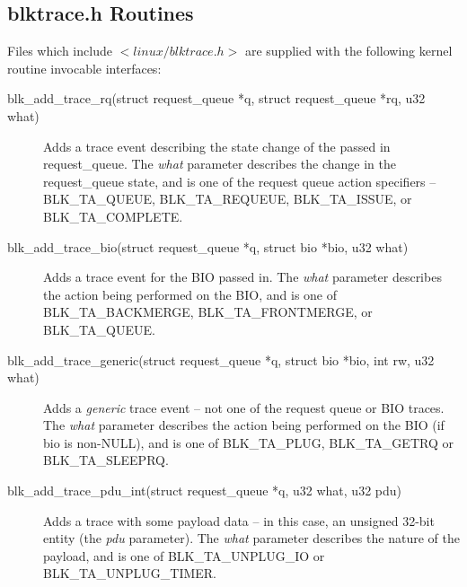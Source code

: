 \documentclass{article}
\begin{document}
\subsection{blktrace.h Routines}
Files which include $<linux/blktrace.h>$ are supplied with the following
kernel routine invocable interfaces:

\begin{description}
  \item[blk\_add\_trace\_rq(struct request\_queue *q, struct request\_queue 
  								*rq, u32 what)]
	Adds a trace event describing the state change of the passed in
	request\_queue. The \emph{what} parameter describes the change in
	the request\_queue state, and is one of the request queue action 
	specifiers -- BLK\_TA\_QUEUE, BLK\_TA\_REQUEUE, BLK\_TA\_ISSUE,
	or BLK\_TA\_COMPLETE.

  \item[blk\_add\_trace\_bio(struct request\_queue *q, struct bio *bio, 
  								u32 what)]
	Adds a trace event for the BIO passed in. The \emph{what} parameter
	describes the action being performed on the BIO, and is one of
	BLK\_TA\_BACKMERGE, BLK\_TA\_FRONTMERGE, or BLK\_TA\_QUEUE.

  \item[blk\_add\_trace\_generic(struct request\_queue *q, struct bio *bio, 
							int rw, u32 what)]
	Adds a \emph{generic} trace event -- not one of the request queue
	or BIO traces. The \emph{what} parameter describes the action being 
	performed on the BIO (if bio is non-NULL), and is one of
	BLK\_TA\_PLUG, BLK\_TA\_GETRQ or BLK\_TA\_SLEEPRQ.

  \item[blk\_add\_trace\_pdu\_int(struct request\_queue *q, u32 what,
  								u32 pdu)]
	Adds a trace with some payload data -- in this case, an unsigned
	32-bit entity (the \emph{pdu} parameter). The \emph{what} parameter
	describes the nature of the payload, and is one of
	BLK\_TA\_UNPLUG\_IO or BLK\_TA\_UNPLUG\_TIMER.

\end{description}
\end{document}
